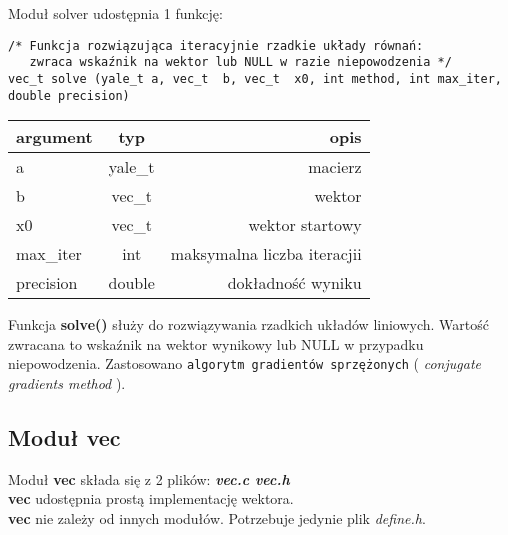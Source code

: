 \documentclass[bibtotocnumbered, headsepline,normalheadings,12pt,polish]{scrreprt}
\begin{document}
Moduł solver udostępnia 1 funkcję:
\small
\begin{verbatim}
/* Funkcja rozwiązująca iteracyjnie rzadkie układy równań: 
   zwraca wskaźnik na wektor lub NULL w razie niepowodzenia */
vec_t solve (yale_t a, vec_t  b, vec_t  x0, int method, int max_iter, double precision)
\end{verbatim}
\normalsize
\begin{tabular}{| l | c | r |}
\hline
argument & typ & opis \\
\hline
a & yale\_t & macierz\\
b & vec\_t & wektor\\
x0 & vec\_t & wektor startowy\\
max\_iter & int & maksymalna liczba iteracjii\\
precision & double & dokładność wyniku\\
\hline
\end{tabular}

Funkcja \textbf{solve()} służy do rozwiązywania rzadkich układów liniowych. Wartość zwracana to wskaźnik na wektor wynikowy lub NULL w przypadku niepowodzenia.
Zastosowano \texttt{algorytm gradientów sprzężonych} ( \textit{conjugate gradients method} ).


\subsection{Moduł vec}
\normalsize
Moduł \textbf{vec} składa się z 2 plików: \textit{\textbf{vec.c vec.h}}\\
\textbf{vec} udostępnia prostą implementację wektora.\\
\textbf{vec} nie zależy od innych modułów. Potrzebuje jedynie plik \large\emph{define.h}.\normalsize\\
\end{document}
